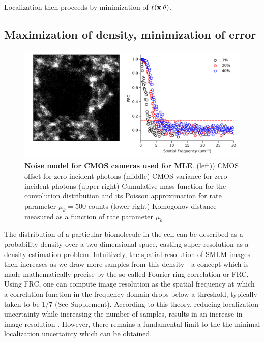 Localization then proceeds by minimization of $\ell(\bold{x}\lvert\theta)$. 


\subsection{Maximization of density, minimization of error}

\begin{figure}[t]
\begin{center}
\includegraphics[width=14cm]{media/FRC.png}
\end{center}
\caption{\textbf{Noise model for CMOS cameras used for MLE}. (left)) CMOS offset for zero incident photons (middle) CMOS variance for zero incident photons (upper right) Cumulative mass function for the convolution distribution and its Poisson approximation for rate parameter $\mu_{k} = 500$ counts (lower right) Komogonov distance measured as a function of rate parameter $\mu_{k}$}
\end{figure}


The distribution of a particular biomolecule in the cell can be described as a probability density over a two-dimensional space, casting super-resolution as a density estimation problem. Intuitively, the spatial resolution of SMLM images then increases as we draw more samples from this density - a concept which is made mathematically precise by the so-called Fourier ring correlation or FRC. Using FRC, one can compute image resolution as the spatial frequency at which a correlation function in the frequency domain drops below a threshold, typically taken to be $1/7$ (See Supplement). According to this theory, reducing localization uncertainty while increasing the number of samples, results in an increase in image resolution \parencite{Nieuwenhuizen2013}. However, there remains a fundamental limit to the the minimal localization uncertainty which can be obtained.


